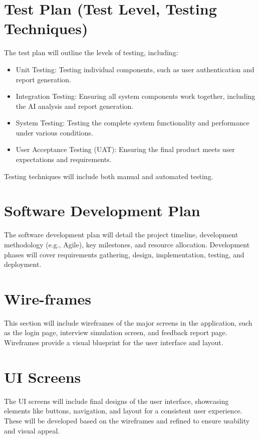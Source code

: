 \section{Test Plan (Test Level, Testing Techniques)} The test plan will outline the levels of testing, including: \begin{itemize} \item Unit Testing: Testing individual components, such as user authentication and report generation. \item Integration Testing: Ensuring all system components work together, including the AI analysis and report generation. \item System Testing: Testing the complete system functionality and performance under various conditions. \item User Acceptance Testing (UAT): Ensuring the final product meets user expectations and requirements. \end{itemize}

Testing techniques will include both manual and automated testing.

\section{Software Development Plan} The software development plan will detail the project timeline, development methodology (e.g., Agile), key milestones, and resource allocation. Development phases will cover requirements gathering, design, implementation, testing, and deployment.

\section{Wire-frames} This section will include wireframes of the major screens in the application, such as the login page, interview simulation screen, and feedback report page. Wireframes provide a visual blueprint for the user interface and layout.

\section{UI Screens} The UI screens will include final designs of the user interface, showcasing elements like buttons, navigation, and layout for a consistent user experience. These will be developed based on the wireframes and refined to ensure usability and visual appeal.